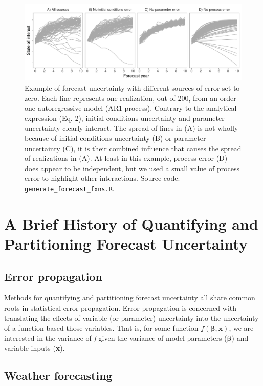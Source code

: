 \documentclass[12pt,]{article}
\begin{document}
\begin{figure}
\centering
\includegraphics{../figures/forecast_uncertainty_example.pdf}
\caption{Example of forecast uncertainty with different sources of error
set to zero. Each line represents one realization, out of 200, from an
order-one autoregressive model (AR1 process). Contrary to the analytical
expression (Eq. 2), initial conditions uncertainty and parameter
uncertainty clearly interact. The spread of lines in (A) is not wholly
because of initial conditions uncertainty (B) or parameter uncertainty
(C), it is their combined influence that causes the spread of
realizations in (A). At least in this example, process error (D) does
appear to be independent, but we used a small value of process error to
highlight other interactions. Source code:
\texttt{generate\_forecast\_fxns.R}.}
\end{figure}

\section{A Brief History of Quantifying and Partitioning Forecast
Uncertainty}\label{a-brief-history-of-quantifying-and-partitioning-forecast-uncertainty}

\subsection{Error propagation}\label{error-propagation}

Methods for quantifying and partitioning forecast uncertainty all share
common roots in statistical error propagation. Error propagation is
concerned with translating the effects of variable (or parameter)
uncertainty into the uncertainty of a function based those variables.
That is, for some function \(f(\bm{\beta},\textbf{x})\), we are
interested in the variance of \emph{f} given the variance of model
parameters (\(\bm{\beta}\)) and variable inputs (\textbf{x}).

\subsection{Weather forecasting}\label{weather-forecasting}
\end{document}
